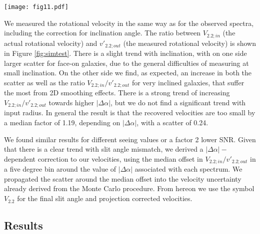 \documentclass{emulateapj}
\begin{document}
\begin{figure*}
\begin{center}
\texttt{[image: fig11.pdf]}
\caption{{Results of simulating 500 MOSFIRE spectra, with a 0.6$\arcsec$ PSF and typical SNR. We show the offset between input and measured {velocity} as a function of inclination, $|\Delta \alpha|$ and input $R_s$. The red lines are the running median and $1\sigma$ percentiles. {There is a slight trend with inclination, indicating mixing of light plays a role, no trend with input $R_s$, and a strong trend with slit mismatch.}}}
\label{fig:simtest}
\end{center}
\end{figure*}

We measured the rotational velocity in the same way as for the observed spectra, including the correction for inclination angle. The {ratio between $V_{2.2;in}$ (the actual rotational velocity) and $v'_{2.2;out}$ (the measured rotational velocity) is} shown in Figure \ref{fig:simtest}. There is a slight trend with inclination, with on one side larger scatter for face-on galaxies, due to the general difficulties of measuring at small inclination. On the other side we find, as expected, an increase in both the scatter as well as the ratio $V_{2.2;in}/v'_{2.2;out}$ for very inclined galaxies, that suffer the most from 2D smoothing effects. {T}here is a {strong} trend of increasing $V_{2.2;in}/v'_{2.2;out}$ towards higher $|\Delta \alpha|$, {but we do not find a significant trend with} input radi{us}. {In general the result is that the recovered velocities are too small by a median factor of 1.19, depending on $|\Delta \alpha|$, with a scatter of 0.24}.

We found similar results for different seeing values {or a factor 2 lower SNR}. Given that {there is a clear trend with slit angle mismatch}, {we derived a $|\Delta \alpha|-$dependent correction} to our velocities{, using the median offset in $V_{2.2;in}/v'_{2.2;out}$ in a five degree bin around the value of $|\Delta \alpha|$ associated with each spectrum. We propagated the scatter around the median offset into the velocity uncertainty already derived from the Monte Carlo procedure. From hereon we use the symbol $V_{2.2}$ for the final slit angle and projection corrected velocities}.

\subsection{Results}
\label{sec:res}
\end{document}
